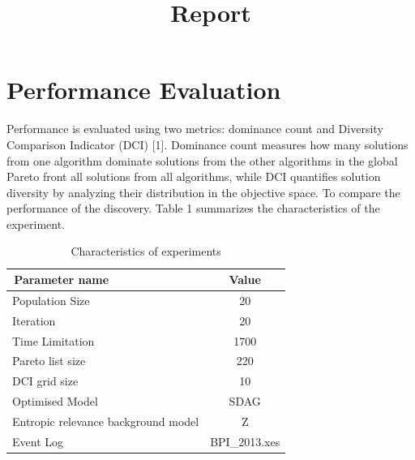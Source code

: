 \documentclass{article}
\begin{document}
\title{Report}
\section{Performance Evaluation}
Performance is evaluated using two metrics: dominance count and Diversity Comparison
Indicator (DCI) [1]. Dominance count measures how many solutions from
one algorithm dominate solutions from the other algorithms in the global Pareto front
all solutions from all algorithms, while DCI quantifies solution diversity by analyzing
their distribution in the objective space. To compare the performance of the discovery.
Table 1 summarizes the characteristics of the experiment.
\begin{table}[htbp]
\vspace{-5mm}
\caption{Characteristics of experiments}\vspace{+1mm}
\label{tbl:1}
\centering %
\setlength{\tabcolsep}{1pt} %
\fontsize{7}{9}\selectfont
\begin{tabular}{|l|c|}
\hline
\,Parameter name & Value \\
\hline %
Population Size &20\\\hline %
Iteration &20\\\hline %
Time Limitation &1700\\\hline %
Pareto list size &220\\\hline %
DCI grid size &10\\\hline %
Optimised Model&SDAG\\\hline %
Entropic relevance background model &Z\\\hline %
Event Log &BPI\_2013.xes\\\hline %
\end{tabular}
\vspace{-3.75mm}
\end{table}
\end{document}
